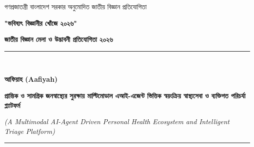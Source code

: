 \documentclass[12pt,a4paper,oneside]{report}
\begin{document}
\begin{titlepage}
    \begin{tcolorbox}[
        enhanced,
        colback=white,
        colframe=deepEmerald,
        arc=0mm,
        boxrule=2.5pt,
        height=\textheight,
        left=20pt,
        right=20pt,
        top=25pt,
        bottom=25pt
    ]
    \centering
    
    \vspace*{0.3cm}
    {\scshape\Large গণপ্রজাতন্ত্রী বাংলাদেশ সরকার অনুমোদিত জাতীয় বিজ্ঞান প্রতিযোগিতা \par}
    \vspace{0.4cm}
    {\Huge\bfseries\textcolor{accentCoral}{"ভবিষ্যৎ বিজ্ঞানীর খোঁজে ২০২৬"}\par}
    \vspace{0.2cm}
    {\large\bfseries জাতীয় বিজ্ঞান মেলা ও উদ্ভাবনী প্রতিযোগিতা ২০২৬ \par}
    
    \vspace{1.0cm}
    \rule{\linewidth}{1.5pt}\\[0.4cm]
    {\huge\bfseries\textcolor{deepEmerald}{আফিয়াহ (Aafiyah)}\par}
    \vspace{0.3cm}
    {\Large\bfseries প্রান্তিক ও সামগ্রিক জনস্বাস্থ্যের সুরক্ষায় মাল্টিমোডাল এআই-এজেন্ট ভিত্তিক স্বয়ংক্রিয় স্বাস্থ্যসেবা ও ব্যক্তিগত পরিচর্যা প্ল্যাটফর্ম\par}
    \vspace{0.2cm}
    {\normalsize\textit{(A Multimodal AI-Agent Driven Personal Health Ecosystem and Intelligent Triage Platform)}\par}
    \rule{\linewidth}{1.5pt}
    

\end{tcolorbox}
\end{titlepage}
\end{document}
